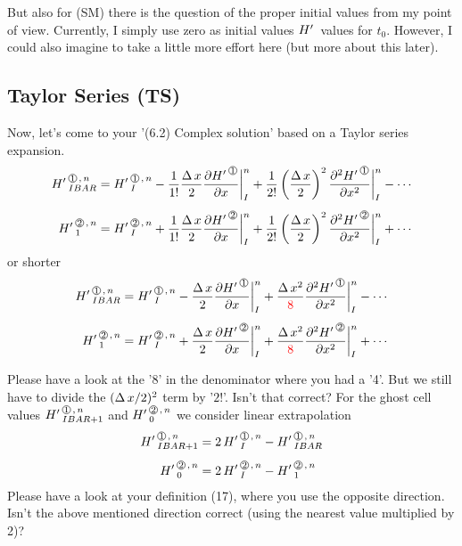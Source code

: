 But also for (SM) there is the question of the proper initial values from my point of view. Currently, I simply use zero as initial values ${H'\,}$ values for $t_0$. However, I could also imagine to take a little more effort here (but more about this later).

\subsection{Taylor Series (TS)}

Now, let's come to your '(6.2) Complex solution' based on a Taylor series expansion.
\begin{align}
\HL{IBAR}{1}{n}  & =  \HL{I}{1}{n} - \frac{1}{1!}\frac{\DX}{2} \frac{\HPN{1}} {\DXP} \bigg|_{I}^n 
                                                    + \frac{1}{2!}\left(\frac{\DX}{2}\right)^2 \frac{\HPNT{1}} {\DXPT} \bigg|_{I}^n  - \cdots \label{BC-TSA}
 \\[1ex]
\HL{1}{2}{n}  & =  \HL{I}{2}{n} + \frac{1}{1!}\frac{\DX}{2} \frac{\HPN{2}} {\DXP} \bigg|_{I}^n 
                                                    + \frac{1}{2!}\left(\frac{\DX}{2}\right)^2 \frac{\HPNT{2}} {\DXPT} \bigg|_{I}^n  + \cdots   \nonumber                                                         
\end{align}
or shorter
\begin{align}
\HL{IBAR}{1}{n}  & =  \HL{I}{1}{n} - \frac{\DX}{2} \frac{\HPN{1}} {\DXP} \bigg|_{I}^n 
                                                     + \frac{\DXT}{\color{red}{8}} \frac{\HPNT{1}} {\DXPT} \bigg|_{I}^n  - \cdots \label{BC-TSB}
 \\[1ex]
\HL{1}{2}{n}  & =  \HL{I}{2}{n} + \frac{\DX}{2} \frac{\HPN{2}} {\DXP} \bigg|_{I}^n 
                                                     + \frac{\DXT}{\color{red}{8}}\frac{\HPNT{2}} {\DXPT} \bigg|_{I}^n  + \cdots    \nonumber                                                 
\end{align}



Please have a look at the '8' in the denominator where you had a '4'. But we still have to divide the $(\Delta \, x / 2)^2$ term by '$2!$'. Isn't that correct? 
For the ghost cell values $\HL{IBAR+1}{1}{n}$ and $\HL{0}{2}{n}$ we consider linear extrapolation
\begin{align}
\label{Extrapolation}
\HL{IBAR+1}{1}{n} & = 2\, \HL{I}{1}{n} -  \HL{IBAR}{1}{n} \\[1ex]
\HL{0}{2}{n} & = 2 \,\HL{I}{2}{n} -  \HL{1}{2}{n}   \nonumber     
\end{align}
Please have a look at your definition (17), where you use the opposite direction. Isn't the above mentioned direction correct (using the nearest value multiplied by 2)?

